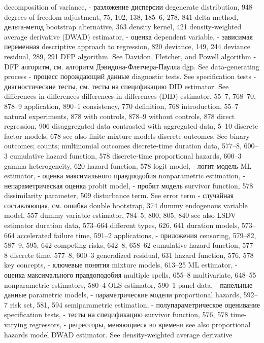 decomposition of variance, - разложение дисперсии
degenerate distribution, 948
degrees-of-freedom adjustment, 75, 102, 138, 185–6,
278, 841
delta method, - дельта-метод
bootstrap alternative, 363
density kernel, 421
density-weighted average derivative (DWAD)
estimator, - оценка
dependent variable, - зависимая переменная
descriptive approach to regression, 820
deviance, 149, 244
deviance residual, 289, 291
DFP algorithm. See Davidon, Fletcher, and Powell
algorithm - DFP алгоритм, см. алгоритм Дэвидона-Флетчера-Паулла
dgp. See data-generating process - процесс порождающий данные
diagnostic tests. See specification tests - диагностические тесты, см. тесты на спецификацию
DID estimator. See differences-in-differences differences-in-differences (DID) estimator, 55–7,
768–70, 878–9 application, 890–1 consistency, 770 definition, 768 introduction, 55–7 natural experiments, 878 with controls, 878–9 without controls, 878
direct regression, 906 disaggregated data
contrasted with aggregated data, 5–10 discrete factor models, 678
see also finite mixture models
discrete outcomes. See binary outcomes; counts;
multinomial outcomes
discrete-time duration data, 577–8, 600–3
cumulative hazard function, 578 discrete-time proportional hazards, 600–3 gamma heterogeneity, 620
hazard function, 578
logit model, - логит-модель
ML estimator, - оценка максимального правдподобия
nonparametric estimation, - непараметрическая оценка
probit model, - пробит модель
survivor function, 578
dissimilarity parameter, 509
disturbance term. See error term - случайная составляющая, см. ошибка
double bootstrap, 374
dummy endogenous variable model, 557 dummy variable estimator, 784–5, 800, 805, 840
see also LSDV estimator duration data, 573–664
different types, 626, 641 duration models, 573–664
accelerated failure time, 591–2
applications, - приложения
censoring, 579–82, 587–9, 595, 642 competing risks, 642–8, 658–62
cumulative hazard function, 577–8 discrete time, 577–8, 600–3 generalized residual, 631
hazard function, 576, 578
key concepts, - ключевые понятия
mixture models, 613–25
ML estimator, - оценка максимального правдоподобия
multiple spells, 655–8 multivariate, 648–55 nonparametric estimators, 580–4 OLS estimator, 590–1
panel data, - панельные данные
parametric models, - параметрические модели
proportional hazards, 592–7
risk set, 581, 594
semiparametric estimation, - полупараметрическое оценивание 
specification tests, - тесты на спецификацию
survivor function, 576, 578
time-varying regressors, - регрессоры, меняющиеся во времени
see also proportional hazards model
DWAD estimator. See density-weighted average derivative
